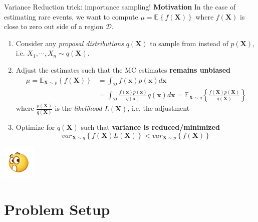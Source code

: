 \documentclass{beamer}
\newcommand{\matr}[1]{\mathbf{#1}}
\newcommand{\E}[2][]{\mathbb{E}_{#1}\left\{#2\right\}}
\newcommand{\var}[2][]{var_{#1}\left\{#2\right\}}
\newcommand{\bx}{\matr{x}}
\newcommand{\bX}{\matr{X}}
\begin{document}
\begin{frame}{Variance Reduction trick: importance sampling!}
\textbf{Motivation} In the case of estimating rare events, we want to compute $\mu = \E{f(\bX)}$ where $f(\bX)$ is close to zero out side of a region $\mathcal{D}$. 
\begin{enumerate}
    \item Consider any \textit{proposal distributions} $q(\bX)$ to sample from instead of $p(\bX)$, i.e. $X_1, \cdots, X_n \sim q(\bX)$. 
    \item Adjust the estimates such that the MC estimates \textbf{remains unbiased}
    \begin{align*}
        \mu = \E[\bX \sim p]{f(\bX)} 
        &= \int_{\mathcal{D}} f(\bx) p(\bx) d\bx \\
        &= \int_{\mathcal{D}} \frac{f(\bx)p(\bx)}{q(\bx)} q(\bx) d\bx 
        = \E[\bX \sim q]{\frac{f(\bX)p(\bX)}{q(\bX)}}
    \end{align*}
    where $\frac{p(\bX)}{q(\bX)}$ is the \textit{likelihood} $L(\bX)$, i.e. the adjustment
    \item Optimize for $q(\bX)$ such that \textbf{variance is reduced/minimized}
    \[
        \var[\bX \sim q]{f(\bX) L(\bX)} < 
        \var[\bX \sim p]{f(\bX)}
    \]
\end{enumerate}
\begin{center}
    \includegraphics{surprise.png}
\end{center}
\end{frame}


\section{Problem Setup}
 
\end{document}
